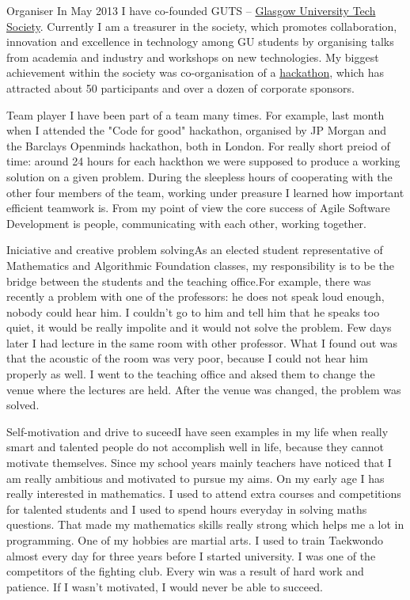 \documentclass{tccv}
\begin{document}
\begin{skillist}
\item{Organiser} {In May 2013 I have co-founded GUTS -- \href{http://gutechsoc.com}{Glasgow University Tech Society}. Currently I am a treasurer in the society, which promotes collaboration, innovation and excellence in technology among GU students by organising talks from academia and industry and workshops on new technologies. My biggest achievement within the society was co-organisation of a \href{http://storify.com/Eventhread/gu-hackaton}{hackathon}, which has attracted about 50 participants and over a dozen of corporate sponsors.}
\item{Team player} {I have been part of a team many times. For example, last month when I attended the "Code for good" hackathon, organised by JP Morgan and the Barclays Openminds hackathon, both in London. For really short preiod of time: around 24 hours for each hackthon we were supposed to produce a working solution on a given problem. During the sleepless hours of cooperating with the other four members of the team, working under preasure I learned how important efficient teamwork is. From my point of view the core success of Agile Software Development is people, communicating with each other, working together.}
\item{Iniciative and creative problem solving}{As an elected student representative of Mathematics and Algorithmic Foundation classes, my responsibility is to be the bridge between the students and the teaching office.For example, there was recently a problem with one of the professors: he does not speak loud enough, nobody could hear him. I couldn't go to him and tell him that he speaks too quiet, it would be really impolite and it would not solve the problem. Few days later I had lecture in the same room with other professor. What I found out was that the acoustic of the room was very poor, because I could not hear him properly as well. I went to the teaching office and aksed them to change the venue where the lectures are held. After the venue was changed, the problem was solved.} 
\item{Self-motivation and drive to suceed}{I have seen examples in my life when really smart and talented people do not accomplish well in life, because they cannot motivate themselves. Since my school years mainly teachers have noticed that I am really ambitious and motivated to pursue my aims. On my early age I has really interested in mathematics. I used to attend extra courses and competitions for talented students and I used to spend hours everyday in solving maths questions. That made my mathematics skills really strong which helps me a lot in programming. One of my hobbies are martial arts. I used to train Taekwondo almost every day for three years before I started university. I was one of the competitors of the fighting club. Every win was a result of hard work and patience. If I wasn't motivated, I would never be able to succeed. }

\end{skillist}
\end{document}
